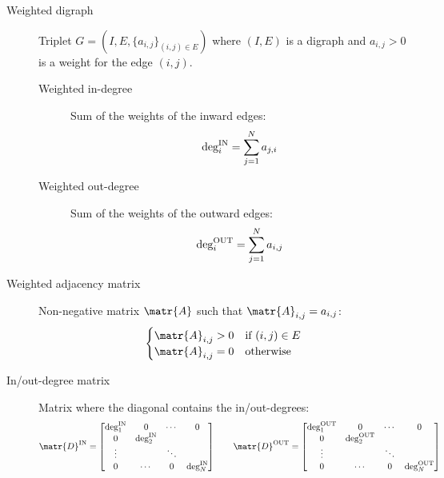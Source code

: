 \begin{description}
    \item[Weighted digraph] 
        Triplet $G=(I, E, \{a_{i, j}\}_{(i,j) \in E})$ where $(I, E)$ is a digraph and $a_{i,j} > 0$ is a weight for the edge $(i,j)$.

        \begin{description}
            \item[Weighted in-degree] 
                Sum of the weights of the inward edges:
                \[ \indeg[i] = \sum_{j=1}^N a_{j, i} \]
            \item[Weighted out-degree] 
                Sum of the weights of the outward edges:
                \[ \outdeg[i] = \sum_{j=1}^N a_{i, j} \]
        \end{description}


    \item[Weighted adjacency matrix] 
        Non-negative matrix $\matr{A}$ such that $\matr{A}_{i,j} = a_{i,j}$:
        \[
            \begin{cases}
                \matr{A}_{i,j} > 0 & \text{if $(i, j) \in E$} \\
                \matr{A}_{i, j} = 0 & \text{otherwise}
            \end{cases}
        \]

    \item[In/out-degree matrix] 
        Matrix where the diagonal contains the in/out-degrees:
        \[
            \matr{D}^\text{IN} = \begin{bmatrix}
                \indeg[1] & 0 & \cdots & 0 \\
                0 & \indeg[2] \\
                \vdots & & \ddots \\
                0 & \cdots & 0 & \indeg[N] \\
            \end{bmatrix}
            \qquad
            \matr{D}^\text{OUT} = \begin{bmatrix}
                \outdeg[1] & 0 & \cdots & 0 \\
                0 & \outdeg[2] \\
                \vdots & & \ddots \\
                0 & \cdots & 0 & \outdeg[N] \\
            \end{bmatrix}
        \]


\end{description}
